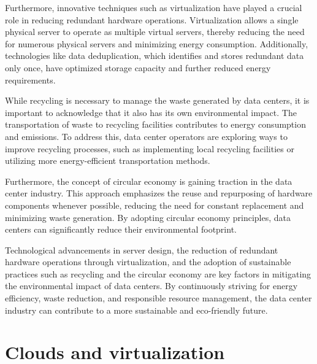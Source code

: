 \documentclass[
  a4paper,  %
  twoside,  %
  bibliography=totoc,
  headsepline,
  cleardoublepage=empty,
  parskip=half,
  draft=false
]{scrbook}
\begin{document}

Furthermore, innovative techniques such as virtualization have played a crucial role in reducing redundant hardware operations\cite{hivenetEWasteCloud}. Virtualization allows a single physical server to operate as multiple virtual servers, thereby reducing the need for numerous physical servers and minimizing energy consumption. Additionally, technologies like data deduplication, which identifies and stores redundant data only once, have optimized storage capacity and further reduced energy requirements.

While recycling is necessary to manage the waste generated by data centers, it is important to acknowledge that it also has its own environmental impact. The transportation of waste to recycling facilities contributes to energy consumption and emissions\cite{nor2019energy}. To address this, data center operators are exploring ways to improve recycling processes, such as implementing local recycling facilities or utilizing more energy-efficient transportation methods.

Furthermore, the concept of circular economy is gaining traction in the data center industry. This approach emphasizes the reuse and repurposing of hardware components whenever possible, reducing the need for constant replacement and minimizing waste generation. By adopting circular economy principles, data centers can significantly reduce their environmental footprint\cite{datacentremagazineNavigatingAddressing}.

Technological advancements in server design, the reduction of redundant hardware operations through virtualization, and the adoption of sustainable practices such as recycling and the circular economy are key factors in mitigating the environmental impact of data centers. By continuously striving for energy efficiency, waste reduction, and responsible resource management, the data center industry can contribute to a more sustainable and eco-friendly future.



\chapter{Clouds and virtualization}
\end{document}
